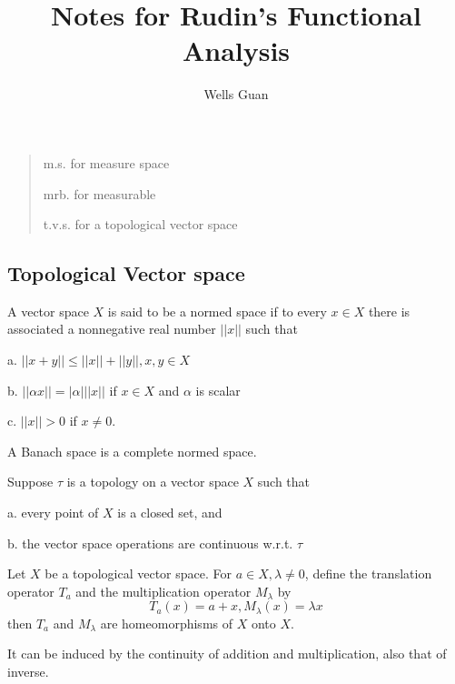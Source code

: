 \documentclass[lang=en, color=blue, ]{elegantbook}
\title{Notes for Rudin's Functional Analysis}
\author{Wells Guan}
\begin{document}


\chapter{}

\begin{quotation}
m.s. for measure space\par
mrb. for measurable\par
t.v.s. for a topological vector space
\end{quotation}

\section{Topological Vector space}

\begin{definition}
    A vector space $X$ is said to be a normed space if to every $x\in X$ there is associated a nonnegative real number $||x||$ such that\par
    a. $||x+y|| \leq ||x||+||y||, x,y\in X$\par
    b. $||\alpha x|| = |\alpha|||x||$ if $x\in X$ and $\alpha$ is scalar\par
    c. $||x||>0$ if $x\neq 0$.\par
    A Banach space is a complete normed space. 
\end{definition}

\begin{definition}
    Suppose $\tau$ is a topology on a vector space $X$ such that\par
    a. every point of $X$ is a closed set, and\par
    b. the vector space operations are continuous w.r.t. $\tau$
\end{definition}

\begin{proposition}
    Let $X$ be a topological vector space. For $a\in X, \lambda \neq 0$, define the translation operator $T_a$ and the multiplication operator $M_{\lambda}$ by
    \[
    T_a(x) = a+x, M_{\lambda}(x) = \lambda x
    \]
    then $T_a$ and $M_{\lambda}$ are homeomorphisms of $X$ onto $X$.
\end{proposition}
It can be induced by the continuity of addition and multiplication, also that of inverse.
\end{document}
